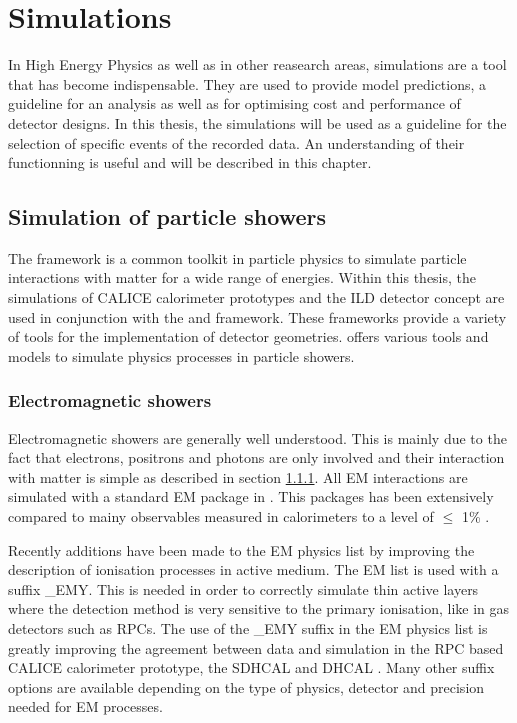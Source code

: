 \chapter{\geant Simulations}
\label{chap:G4Simulation}

In High Energy Physics as well as in other reasearch areas, simulations are a tool that has become indispensable. They are used to provide model predictions, a guideline for an analysis as well as for optimising cost and performance of detector designs. In this thesis, the simulations will be used as a guideline for the selection of specific events of the recorded data. An understanding of their functionning is useful and will be described in this chapter.

\section{Simulation of particle showers}

The \geant framework \cite{Agostinelli2003} is a common toolkit in particle physics to simulate particle interactions with matter for a wide range of energies. Within this thesis, the simulations of CALICE calorimeter prototypes and the ILD detector concept are used in conjunction with the \mokka \cite{Freitas2003} and \ddhep \cite{Frank2014} framework. These frameworks provide a variety of tools for the implementation of detector geometries. \geant offers various tools and models to simulate physics processes in particle showers.

\subsection{Electromagnetic showers}

Electromagnetic showers are generally well understood. This is mainly due to the fact that electrons, positrons and photons are only involved and their interaction with matter is simple as described in section \ref{}. All EM interactions are simulated with a standard EM package in \geant \cite{Ivanchenko2010}. This packages has been extensively compared to mainy observables measured in calorimeters to a level of $\leq$ 1\% \cite{Apostolakis2015}.

Recently additions have been made to the \geant EM physics list by improving the description of ionisation processes in active medium. The EM list is used with a suffix \_{}EMY. This is needed in order to correctly simulate thin active layers where the detection method is very sensitive to the primary ionisation, like in gas detectors such as RPCs. The use of the \_{}EMY suffix in the EM physics list is greatly improving the agreement between data and simulation in the RPC based CALICE calorimeter prototype, the SDHCAL and DHCAL \cite{Neubueser2016}. Many other suffix options are available depending on the type of physics, detector and precision needed for EM processes.

